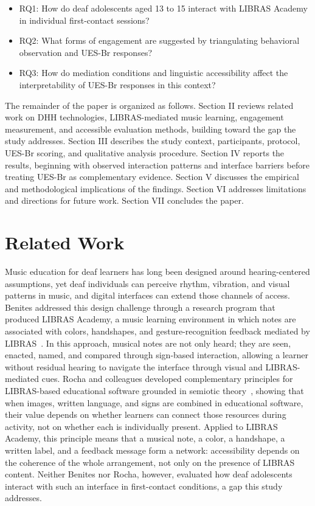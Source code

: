 \documentclass{llncs}
\begin{document}
\begin{itemize}
  \item RQ1: How do deaf adolescents aged 13 to 15 interact with LIBRAS Academy in
  individual first-contact sessions?
  \item RQ2: What forms of engagement are suggested by triangulating behavioral
  observation and UES-Br responses?
  \item RQ3: How do mediation conditions and linguistic accessibility affect the
  interpretability of UES-Br responses in this context?
\end{itemize}

The remainder of the paper is organized as follows. Section II reviews related work on
DHH technologies, LIBRAS-mediated music learning, engagement measurement, and accessible
evaluation methods, building toward the gap the study addresses. Section III describes
the study context, participants, protocol, UES-Br scoring, and qualitative analysis
procedure. Section IV reports the results, beginning with observed interaction patterns
and interface barriers before treating UES-Br as complementary evidence. Section V discusses the empirical and methodological implications of the findings. Section VI addresses limitations and directions for future work. Section VII concludes the paper.

\section{Related Work}

Music education for deaf learners has long been designed around hearing-centered
assumptions, yet deaf individuals can perceive rhythm, vibration, and visual patterns in
music, and digital interfaces can extend those channels of access. Benites addressed this
design challenge through a research program that produced LIBRAS Academy, a music
learning environment in which notes are associated with colors, handshapes, and
gesture-recognition feedback mediated by LIBRAS~\cite{benites2024,benites2024laclo}. In this approach, musical notes are not
only heard; they are seen, enacted, named, and compared through sign-based interaction,
allowing a learner without residual hearing to navigate the interface through visual and
LIBRAS-mediated cues. Rocha and colleagues developed complementary principles for
LIBRAS-based educational software grounded in semiotic theory~\cite{rocha2016,rocha2023uais},
showing that when images, written language, and signs are combined in educational
software, their value depends on whether learners can connect those resources during
activity, not on whether each is individually present. Applied to LIBRAS Academy, this
principle means that a musical note, a color, a handshape, a written label, and a
feedback message form a network: accessibility depends on the coherence of the whole
arrangement, not only on the presence of LIBRAS content. Neither Benites nor Rocha,
however, evaluated how deaf adolescents interact with such an interface in first-contact conditions, a gap this study addresses.
\end{document}
